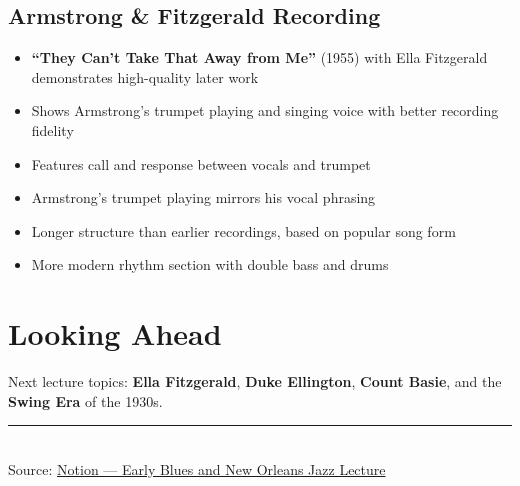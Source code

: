 \documentclass[11pt, letterpaper]{article}
\begin{document}
\subsection{Armstrong \& Fitzgerald Recording}
\begin{itemize}
    \item \textbf{``They Can't Take That Away from Me''} (1955) with Ella Fitzgerald demonstrates high-quality later work
    \item Shows Armstrong's trumpet playing and singing voice with better recording fidelity
    \item Features call and response between vocals and trumpet
    \item Armstrong's trumpet playing mirrors his vocal phrasing
    \item Longer structure than earlier recordings, based on popular song form
    \item More modern rhythm section with double bass and drums
\end{itemize}

\section{Looking Ahead}

Next lecture topics: \textbf{Ella Fitzgerald}, \textbf{Duke Ellington}, \textbf{Count Basie}, and the \textbf{Swing Era} of the 1930s.

\vfill
\begin{center}
    \textcolor{rulecolor}{\rule{0.4\textwidth}{0.4pt}}\\[0.5em]
    {\small\color{gray} Source: \href{https://www.notion.so/Early-Blues-and-New-Orleans-Jazz-Lecture-2f8ed208c188804fa22fdf626b96b492?pvs=189\#2f8ed208c18880a09061fb4270e21f96}{Notion --- Early Blues and New Orleans Jazz Lecture}}
\end{center}
\end{document}
